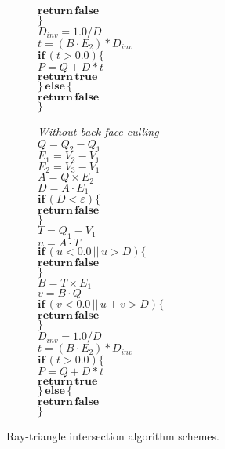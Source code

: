 \begin{figure}[htbp]
\begin{subfigure}[t]{.4\linewidth}
		\quad $\mathbf{return \, false}$\\
		$\}$\\
		$D_{inv} = 1.0 / D$\\
		$t = (B \cdot E_2) * D_{inv}$\\
		$\mathbf{if} \, (t > 0.0) \{$\\
		\quad $P = Q + D * t$\\
		\quad $\mathbf{return \, true}$\\
		$\} \, \mathbf{else} \, \{$\\
		\quad $\mathbf{return \, false}$\\
		$\}$\\
	\end{subfigure}
\hfill
	\begin{subfigure}[t]{.4\textwidth}
		\raggedright
		\textit{Without back-face culling}\\
		\vspace{.5em}
		$Q = Q_2 - Q_1$\\
		$E_1 = V_2 - V_1$\\
		$E_2 = V_3 - V_1$\\
		$A = Q \times E_2$\\
		$D = A \cdot E_1$\\
		$\mathbf{if} \, (D < \varepsilon) \{$\\
		\quad $\mathbf{return \, false}$\\
		$\}$\\
		$T = Q_1 - V_1$\\
		$u = A \cdot T$\\
		$\mathbf{if} \, (u < 0.0 \, || \, u > D) \{$\\
		\quad $\mathbf{return \, false}$\\
		$\}$\\
		$B = T \times E_1$\\
		$v = B \cdot Q$\\
		$\mathbf{if} \, (v < 0.0 \, || \, u + v > D) \{$\\
		\quad \quad $\mathbf{return \, false}$\\
		$\}$\\
		$D_{inv} = 1.0 / D$\\
		$t = (B \cdot E_2) * D_{inv}$\\
		$\mathbf{if} \, (t > 0.0) \{$\\
		\quad $P = Q + D * t$\\
		\quad $\mathbf{return \, true}$\\
		$\} \, \mathbf{else} \, \{$\\
		\quad $\mathbf{return \, false}$\\
		$\}$\\
	\end{subfigure}
\hfill
\caption{Ray-triangle intersection algorithm schemes.}
\end{figure}